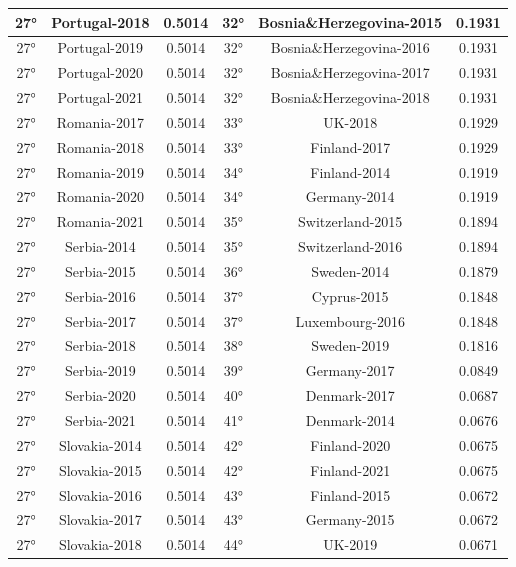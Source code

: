 \documentclass[a4paper,12pt, openright]{report}
\begin{document}
\begin{longtable}[c]{|c|c|c|c|c|c|}
    \hline
    27° & Portugal-2018 & 0.5014 & 32° & Bosnia\&Herzegovina-2015  & 0.1931 \\
    \hline
    27° & Portugal-2019 & 0.5014 & 32° & Bosnia\&Herzegovina-2016  & 0.1931 \\
    \hline
    27° & Portugal-2020 & 0.5014 & 32° & Bosnia\&Herzegovina-2017  & 0.1931 \\
    \hline
    27° & Portugal-2021  & 0.5014 &  32° & Bosnia\&Herzegovina-2018 & 0.1931 \\
    \hline
    27° & Romania-2017 & 0.5014 &  33° & UK-2018 & 0.1929 \\
    \hline
    27° & Romania-2018 & 0.5014 & 33° & Finland-2017 & 0.1929 \\
    \hline
    27° & Romania-2019 & 0.5014 & 34° & Finland-2014 & 0.1919 \\ 
    \hline
    27° & Romania-2020 & 0.5014 & 34° & Germany-2014  & 0.1919 \\ 
    \hline
    27° & Romania-2021  & 0.5014 & 35° & Switzerland-2015 & 0.1894  \\ 
    \hline
    27° & Serbia-2014 & 0.5014 & 35° & Switzerland-2016 & 0.1894 \\ 
    \hline
    27° & Serbia-2015 & 0.5014 & 36° & Sweden-2014 & 0.1879 \\ 
    \hline
    27° & Serbia-2016 & 0.5014& 37° & Cyprus-2015 & 0.1848 \\ 
    \hline
    27° & Serbia-2017 & 0.5014 &  37° & Luxembourg-2016  & 0.1848 \\ 
    \hline
    27° & Serbia-2018  & 0.5014 & 38° & Sweden-2019 & 0.1816 \\ 
    \hline
    27° & Serbia-2019 & 0.5014 & 39° & Germany-2017 & 0.0849 \\
    \hline
    27° & Serbia-2020 & 0.5014 & 40° & Denmark-2017 & 0.0687 \\ 
    \hline
    27° & Serbia-2021 & 0.5014 &  41° & Denmark-2014 & 0.0676 \\ 
    \hline
    27° & Slovakia-2014 & 0.5014 & 42° & Finland-2020  & 0.0675 \\ 
    \hline
    27° & Slovakia-2015  & 0.5014& 42° & Finland-2021 & 0.0675 \\ 
    \hline
    27° & Slovakia-2016 & 0.5014 & 43° & Finland-2015 & 0.0672 \\ 
    \hline
    27° & Slovakia-2017 & 0.5014 & 43° & Germany-2015 & 0.0672 \\
    \hline
    27° & Slovakia-2018 & 0.5014 &  44° & UK-2019 & 0.0671 \\ 

\end{longtable}
\end{document}

